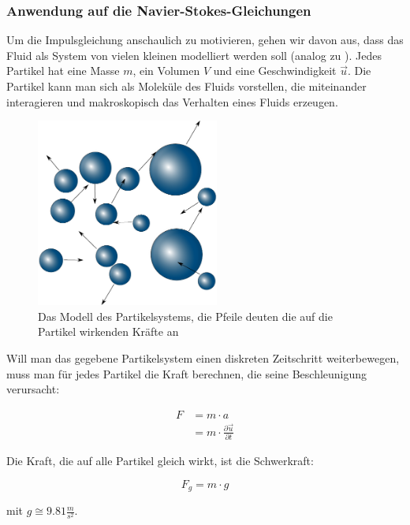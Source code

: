 \subsubsection{Anwendung auf die Navier-Stokes-Gleichungen}

Um die Impulsgleichung anschaulich zu motivieren, gehen wir davon aus, dass das
Fluid als System von vielen kleinen  modelliert werden
soll (analog zu \cite{Bridson2007}). Jedes Partikel hat eine Masse $m$, ein
Volumen $V$ und eine Geschwindigkeit $\vec{u}$. Die Partikel kann man sich als
Moleküle des Fluids vorstellen, die miteinander interagieren und makroskopisch
das Verhalten eines Fluids erzeugen.

\begin{figure}[ht]
\includegraphics[width=6cm]{images/particle_system}
\caption{Das Modell des Partikelsystems, die Pfeile deuten die auf die Partikel wirkenden Kräfte an}
\end{figure}

Will man das gegebene Partikelsystem einen diskreten Zeitschritt weiterbewegen,
muss man für jedes Partikel die Kraft berechnen, die seine Beschleunigung
verursacht:

\begin{equation}
\begin{split}
F & = m \cdot a \\
  & = m \cdot \frac{\partial \vec{u}}{\partial t}
\end{split}
\end{equation}

Die Kraft, die auf alle Partikel gleich wirkt, ist die Schwerkraft:

\begin{equation}
\label{navier_stokes_f_g}
F_g = m \cdot g
\end{equation}

mit $g \cong 9.81 \frac{m}{s^2}$.

